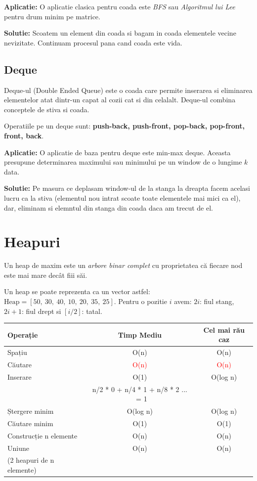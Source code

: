 \documentclass[11pt,a4paper]{article}
\theoremstyle{definition}
\theoremstyle{plain}
\theoremstyle{remark}
\begin{document}
\textbf{Aplicatie:}
O aplicatie clasica pentru coada este \textit{BFS} sau \textit{Algoritmul lui Lee} pentru drum minim pe matrice. 

\textbf{Solutie:}
Scoatem un element din coada si bagam in coada elementele vecine nevizitate. Continuam procesul pana cand coada este vida.

\subsection{Deque}
Deque-ul (Double Ended Queue) este o coada care permite inserarea si eliminarea elementelor atat dintr-un capat al cozii cat si din celalalt. Deque-ul combina conceptele de stiva si coada.

Operatiile pe un deque sunt: \textbf{push-back, push-front, pop-back, pop-front, front, back}.

\textbf{Aplicatie:}
O aplicatie de baza pentru deque este min-max deque. Aceasta presupune determinarea maximului sau minimului pe un window de o lungime $k$ data.

\textbf{Solutie:}
Pe masura ce deplasam window-ul de la stanga la dreapta facem acelasi lucru ca la stiva (elementul nou intrat scoate toate elementele mai mici ca el), dar, eliminam si elemntul din stanga din coada daca am trecut de el.


\section{Heapuri}
Un heap de maxim este un \textit{arbore binar complet} cu proprietatea că fiecare nod este mai mare decât fiii săi.

Un heap se poate reprezenta ca un vector astfel:
$\text{Heap} = [50,\ 30,\ 40,\ 10,\ 20,\ 35,\ 25]$. Pentru o pozitie $i$ avem: $2i$: fiul stang, $2i+1$: fiul drept si $[i/2]$: tatal.

\bigskip
\begin{tabular}{|l|c|c|}
\hline
\textbf{Operație} & \textbf{Timp Mediu} & \textbf{Cel mai rău caz} \\
\hline
Spațiu & O(n) & O(n) \\
\hline
Căutare & \textcolor{red}{O(n)} & \textcolor{red}{O(n)} \\
\hline
Inserare & O(1) & O(log n) \\
 & n/2 * 0 + n/4 * 1 + n/8 * 2 ... ~= 1 & \\
\hline
Ștergere minim & O(log n) & O(log n) \\
\hline
Căutare minim & O(1) & O(1) \\
\hline
Construcție n elemente & O(n) & O(n) \\
\hline
Uniune & O(n) & O(n) \\
(2 heapuri de n elemente) & & \\
\hline
\end{tabular}
\end{document}

